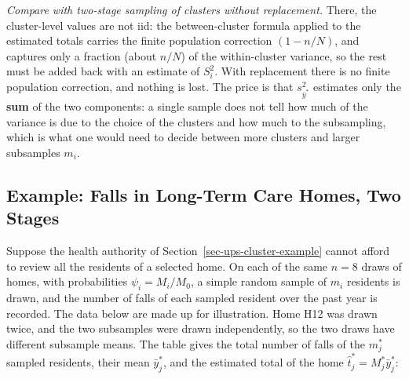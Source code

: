 \documentclass[
  letterpaper,
  DIV=11,
  numbers=noendperiod]{scrreprt}
\renewcommand{\[}{\begin{equation}}
\renewcommand{\]}{\end{equation}}
\begin{document}
\emph{Compare with two-stage sampling of clusters without replacement.}
There, the cluster-level values are not iid: the between-cluster formula
applied to the estimated totals carries the finite population correction
\((1-n/N)\), and captures only a fraction (about \(n/N\)) of the
within-cluster variance, so the rest must be added back with an estimate
of \(S_i^2\). With replacement there is no finite population correction,
and nothing is lost. The price is that \(s_{\bar{y}^*}^2\) estimates
only the \textbf{sum} of the two components: a single sample does not
tell how much of the variance is due to the choice of the clusters and
how much to the subsampling, which is what one would need to decide
between more clusters and larger subsamples \(m_i\).

\subsection{Example: Falls in Long-Term Care Homes, Two
Stages}\label{sec-ups-twostage-example}

Suppose the health authority of Section~\ref{sec-ups-cluster-example}
cannot afford to review all the residents of a selected home. On each of
the same \(n=8\) draws of homes, with probabilities \(\psi_i=M_i/M_0\),
a simple random sample of \(m_i\) residents is drawn, and the number of
falls of each sampled resident over the past year is recorded. The data
below are made up for illustration. Home H12 was drawn twice, and the
two subsamples were drawn independently, so the two draws have different
subsample means. The table gives the total number of falls of the
\(m_j^*\) sampled residents, their mean \(\bar{y}_j^*\), and the
estimated total of the home \(\hat{t}_j^*=M_j^*\bar{y}_j^*\):
\end{document}
